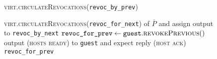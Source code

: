 \begin{figure}[H]
\begin{processbox}{\textsc{virt.circulateRevocations}(\texttt{revoc\_by\_prev})}
\begin{algorithmic}[1]
{      \textsc{virt.circulateRevocations}(\texttt{revoc\_for\_next}) of $\bar{P}$
      and assign output to \texttt{revoc\_by\_next}}
      \State {}
      \State {}
      \State {}
    \EndIf
    \State $\texttt{revoc\_for\_prev} \gets
    \texttt{guest}.\textsc{revokePrevious}()$
    \State output (\textsc{hosts ready}) to \texttt{guest} and expect reply
    (\textsc{host ack})
    \label{code:virtual-layer:revocation:hosts-ready}
    \State \Return \texttt{revoc\_for\_prev} 
    \end{algorithmic}
  \end{processbox}
  \caption{}
  \label{code:virtual-layer:revocation}
\end{figure}

